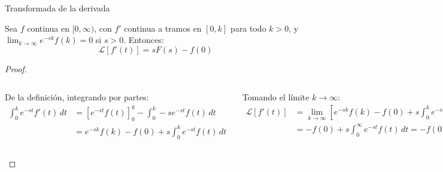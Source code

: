 \documentclass[9pt, aspectratio=169]{beamer}
\begin{document}
\begin{frame}{Transformada de la derivada}
	\begin{theorem}[Transformada de $f'$]
		Sea $f$ continua en $[0, \infty)$, con $f'$ continua a tramos en $[0, k]$ para todo $k > 0$, y $\lim_{k \rightarrow \infty} e^{-s k} f(k) = 0$ si $s > 0$. Entonces:
		\[ \mathscr{L}[f'(t)] = s F(s) - f(0) \]
	\end{theorem}

	{ \small
	\begin{proof}
		\vspace{1em}
		\begin{columns}[t]
			De la definición, integrando por partes:
			\begin{align*}
				\int_0^k e^{-st} f'(t) \, dt & = \left[ e^{-st} f(t) \right]_0^k - \int_0^k -s e^{-st} f(t) \, dt \\
				                             & = e^{-sk}f(k) - f(0) + s \int_0^k e^{-st} f(t) \, dt
			\end{align*}

			Tomando el límite $k \rightarrow \infty$:
			\begin{align*}
				\mathscr{L}[f'(t)] & = \lim_{k \rightarrow \infty} \left[ e^{-sk} f(k) - f(0) + s \int_0^k e^{-st} f(t) \, dt \right] \\
				                   & = -f(0) + s \int_0^{\infty} e^{-st} f(t) \, dt = -f(0) + s F(s)
			\end{align*}
		\end{columns}
	\end{proof}
	}
\end{frame}
\end{document}
